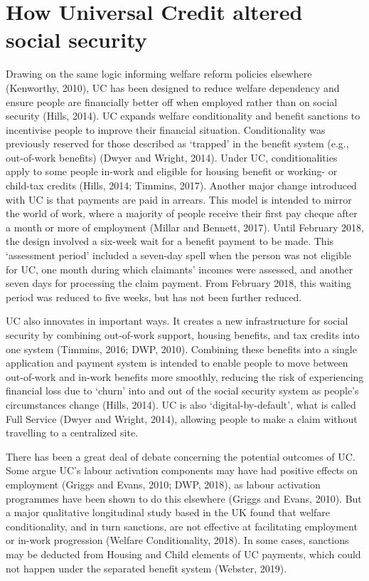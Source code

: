 \documentclass[12pt,article,oneside]{memoir}
\begin{document}
\section*{How Universal Credit altered social security}

Drawing on the same logic informing welfare reform policies elsewhere (Kenworthy, 2010), UC has been designed to reduce welfare dependency and ensure people are financially better off when employed rather than on social security (Hills, 2014). UC expands welfare conditionality and benefit sanctions to incentivise people to improve their financial situation. Conditionality was previously reserved for those described as ‘trapped’ in the benefit system (e.g., out-of-work benefits) (Dwyer and Wright, 2014). Under UC, conditionalities apply to some people in-work and eligible for housing benefit or working- or child-tax credits (Hills, 2014; Timmins, 2017). Another major change introduced with UC is that payments are paid in arrears. This model is intended to mirror the world of work, where a majority of people receive their first pay cheque after a month or more of employment (Millar and Bennett, 2017). Until February 2018, the design involved a six-week wait for a benefit payment to be made. This ‘assessment period’ included a seven-day spell when the person was not eligible for UC, one month during which claimants’ incomes were assessed, and another seven days for processing the claim payment. From February 2018, this waiting period was reduced to five weeks, but has not been further reduced.

UC also innovates in important ways. It creates a new infrastructure for social security by combining out-of-work support, housing benefits, and tax credits into one system (Timmins, 2016; DWP, 2010). Combining these benefits into a single application and payment system is intended to enable people to move between out-of-work and in-work benefits more smoothly, reducing the risk of experiencing financial loss due to ‘churn’ into and out of the social security system as people’s circumstances change (Hills, 2014). UC is also ‘digital-by-default’, what is called Full Service (Dwyer and Wright, 2014), allowing people to make a claim without travelling to a centralized site. 

There has been a great deal of debate concerning the potential outcomes of UC. Some argue UC’s labour activation components may have had positive effects on employment (Griggs and Evans, 2010; DWP, 2018), as labour activation programmes have been shown to do this elsewhere (Griggs and Evans, 2010). But a major qualitative longitudinal study based in the UK found that welfare conditionality, and in turn sanctions, are not effective at facilitating employment or in-work progression (Welfare Conditionality, 2018). In some cases, sanctions may be deducted from Housing and Child elements of UC payments, which could not happen under the separated benefit system (Webster, 2019). 
 
\end{document}
